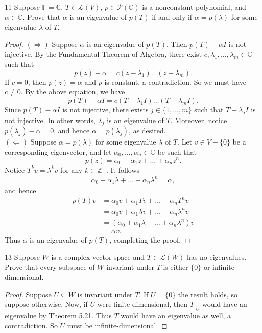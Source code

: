 \documentclass{extarticle}
\newenvironment{problem}[1]{\begin{prob*}{#1}{}}{\end{prob*}}
\newcommand{\Z}{\mathbb{Z}}
\newcommand{\C}{\mathbb{C}}
\newcommand{\F}{\mathbb{F}}
\newcommand{\poly}{\mathcal{P}}
\newcommand{\Hom}{\mathcal{L}}
\newcommand{\restr}[1]{|_{#1}}
\begin{document}
\begin{problem}{11}
Suppose $\F=\C$, $T\in\Hom(V)$, $p\in\poly(\C)$ is a nonconstant polynomial, and $\alpha\in\C$.  Prove that $\alpha$ is an eigenvalue of $p(T)$ if and only if $\alpha=p(\lambda)$ for some eigenvalue $\lambda$ of $T$.
\end{problem}
\begin{proof}
$(\Rightarrow)$ Suppose $\alpha$ is an eigenvalue of $p(T)$.  Then $p(T) - \alpha I$ is not injective.  By the Fundamental Theorem of Algebra, there exist $c, \lambda_1,\dots, \lambda_m\in\C$ such that
\begin{equation*}
p(z) - \alpha = c(z - \lambda_1)\dots (z - \lambda_m).  
\end{equation*}
If $c = 0$, then $p(z) = \alpha$ and $p$ is constant, a contradiction.  So we must have $c\neq 0$.  By the above equation, we have
\begin{equation*}
p(T) - \alpha I = c(T - \lambda_1 I)\dots (T - \lambda_m I).
\end{equation*}
Since $p(T) - \alpha I$ is not injective, there exists $j\in\{1,\dots,m\}$ such that $T-\lambda_j I$ is not injective.  In other words, $\lambda_j$ is an eigenvalue of $T$.  Moreover, notice $p(\lambda_j) - \alpha = 0$, and hence $\alpha = p(\lambda_j)$, as desired.\\
\indent $(\Leftarrow)$ Suppose $\alpha = p(\lambda)$ for some eigenvalue $\lambda$ of $T$.  Let $v\in V-\{0\}$ be a corresponding eigenvector, and let $\alpha_0,\dots,\alpha_n\in\C$ be such that
\begin{equation*}
p(z) = \alpha_0 + \alpha_1z + \dots + \alpha_nz^n.
\end{equation*}
Notice $T^kv = \lambda^kv$ for any $k\in\Z^+$.  It follows
\begin{align*}
\alpha_0 + \alpha_1\lambda + \dots + \alpha_n \lambda^n = \alpha,
\end{align*}
and hence
\begin{align*}
p(T)v &= \alpha_0v + \alpha_1 Tv + \dots + \alpha_n T^n v\\
&= \alpha_0v + \alpha_1\lambda v + \dots + \alpha_n \lambda^n v\\
&= \left(\alpha_0 + \alpha_1\lambda + \dots + \alpha_n \lambda^n \right)v\\
&= \alpha v.
\end{align*}
Thus $\alpha$ is an eigenvalue of $p(T)$, completing the proof.
\end{proof}

\begin{problem}{13}
Suppose $W$ is a complex vector space and $T\in\Hom(W)$ has no eigenvalues.  Prove that every subspace of $W$ invariant under $T$ is either $\{0\}$ or infinite-dimensional.
\end{problem}
\begin{proof}
Suppose $U\subseteq W$ is invariant under $T$.  If $U=\{0\}$ the result holds, so suppose otherwise.  Now, if $U$ were finite-dimensional, then $T\restr{U}$ would have an eigenvalue by Theorem 5.21.  Thus $T$ would have an eigenvalue as well, a contradiction.  So $U$ must be infinite-dimensional.
\end{proof}
\end{document}
